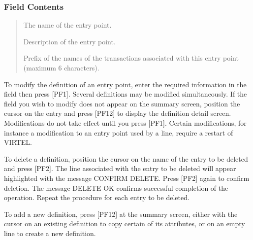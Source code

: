 \documentclass[letterpaper,10pt,english]{sphinxmanual}
\begin{document}
\subsubsection{Field Contents}
\label{\detokenize{connectivity_guide:field-contents}}\begin{quote}
\begin{description}
\sphinxAtStartPar
The name of the entry point.

\sphinxAtStartPar
Description of the entry point.

\sphinxAtStartPar
Prefix of the names of the transactions associated with this entry point (maximum 6 characters).

\end{description}
\end{quote}

\sphinxAtStartPar
{} \sphinxhyphen{} To modify the definition of an entry point, enter the required information in the field then press {[}PF1{]}. Several definitions may be modified simultaneously. If the field you wish to modify does not appear on the summary screen, position the cursor on the entry and press {[}PF12{]} to display the definition detail screen. Modifications do not take effect until you press {[}PF1{]}. Certain modifications, for instance a modification to an entry point used by a line, require a restart of VIRTEL.

\sphinxAtStartPar
{} \sphinxhyphen{} To delete a definition, position the cursor on the name of the entry to be deleted and press {[}PF2{]}. The line associated with the entry to be deleted will appear highlighted with the message CONFIRM DELETE. Press {[}PF2{]} again to confirm deletion. The message DELETE OK confirms successful completion of the operation. Repeat the procedure for each entry to be deleted.

\sphinxAtStartPar
{} \sphinxhyphen{} To add a new definition, press {[}PF12{]} at the summary screen, either with the cursor on an existing definition to copy certain of its attributes, or on an empty line to create a new definition.

\ignorespaces 
\end{document}
